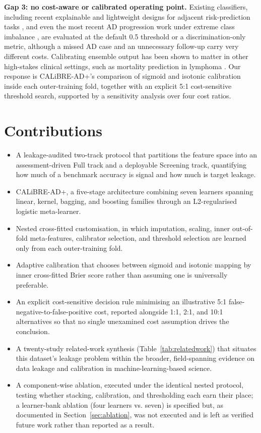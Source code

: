 \documentclass[conference]{IEEEtran}
\begin{document}
\textbf{Gap 3: no cost-aware or calibrated operating point.} Existing classifiers, including recent explainable and lightweight designs for adjacent risk-prediction tasks \cite{b22,b23}, and even the most recent AD progression work under extreme class imbalance \cite{b39}, are evaluated at the default 0.5 threshold or a discrimination-only metric, although a missed AD case and an unnecessary follow-up carry very different costs. Calibrating ensemble output has been shown to matter in other high-stakes clinical settings, such as mortality prediction in lymphoma \cite{b24}. Our response is CALiBRE-AD+'s comparison of sigmoid and isotonic calibration inside each outer-training fold, together with an explicit 5:1 cost-sensitive threshold search, supported by a sensitivity analysis over four cost ratios.

\section{Contributions}
\begin{itemize}
\item A leakage-audited two-track protocol that partitions the feature space into an assessment-driven Full track and a deployable Screening track, quantifying how much of a benchmark accuracy is signal and how much is target leakage.
\item CALiBRE-AD+, a five-stage architecture combining seven learners spanning linear, kernel, bagging, and boosting families through an L2-regularised logistic meta-learner.
\item Nested cross-fitted customisation, in which imputation, scaling, inner out-of-fold meta-features, calibrator selection, and threshold selection are learned only from each outer-training fold.
\item Adaptive calibration that chooses between sigmoid and isotonic mapping by inner cross-fitted Brier score rather than assuming one is universally preferable.
\item An explicit cost-sensitive decision rule minimising an illustrative 5:1 false-negative-to-false-positive cost, reported alongside 1:1, 2:1, and 10:1 alternatives so that no single unexamined cost assumption drives the conclusion.
\item A twenty-study related-work synthesis (Table~\ref{tab:relatedwork}) that situates this dataset's leakage problem within the broader, field-spanning evidence on data leakage and calibration in machine-learning-based science.
\item A component-wise ablation, executed under the identical nested protocol, testing whether stacking, calibration, and thresholding each earn their place; a learner-bank ablation (four learners vs. seven) is specified but, as documented in Section~\ref{sec:ablation}, was not executed and is left as verified future work rather than reported as a result.
\end{itemize}
\end{document}
